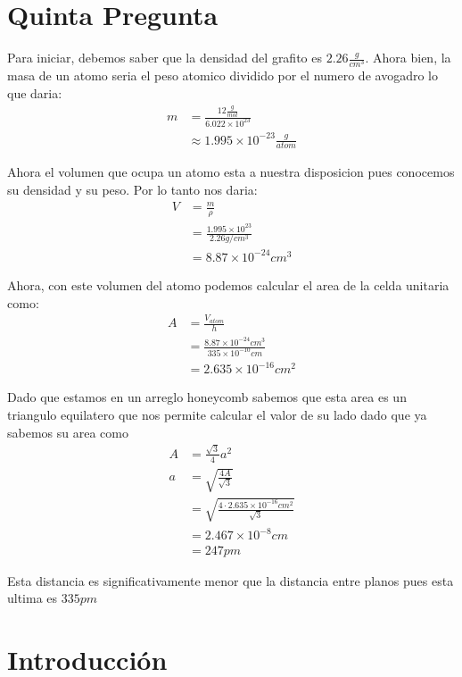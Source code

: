 \documentclass[a4paper, amsfonts, amssymb, amsmath, reprint, showkeys, nofootinbib, twoside]{revtex4-1}
\begin{document}
\section{Quinta Pregunta}

Para iniciar, debemos saber que la densidad del grafito es $2.26 \frac{g}{cm^3}$\cite{HandbookGraphite}. Ahora bien, la masa de un atomo seria el peso atomico dividido por el numero de avogadro lo que daria:
\begin{align*}
  m &= \frac{12 \frac{g}{mol}}{6.022\times 10^{23}}\\
  &\approx 1.995 \times 10^{-23} \frac{g}{atom}
\end{align*}

Ahora el volumen que ocupa un atomo esta a nuestra disposicion pues conocemos su densidad y su peso. Por lo tanto nos daria:
\begin{align*}
  V &= \frac{m}{\rho}\\
  &= \frac{1.995\times 10^{23}}{2.26 g/cm^3}\\
  &= 8.87 \times 10^{-24} cm^3
\end{align*}

Ahora, con este volumen del atomo podemos calcular el area de la celda unitaria como:
\begin{align*}
  A &= \frac{V_{atom}}{h}\\
  &= \frac{8.87 \times 10^{-24} cm^3}{335 \times 10^{-10} cm}\\
  &= 2.635 \times 10^{-16} cm^2
\end{align*}

Dado que estamos en un arreglo honeycomb sabemos que esta area es un triangulo equilatero que nos permite calcular el valor de su lado dado que ya sabemos su area como
\begin{align*}
  A &= \frac{\sqrt{3}}{4} a^2\\
  a &= \sqrt{\frac{4 A}{\sqrt{3}}}\\
  &= \sqrt{\frac{4 \cdot 2.635 \times 10^{-16} cm^2}{\sqrt{3}}}\\
  &= 2.467 \times 10^{-8} cm\\
  &= 247 pm
\end{align*}

Esta distancia es significativamente menor que la distancia entre planos pues esta ultima es $335pm$


\section{Introducción}
\end{document}
